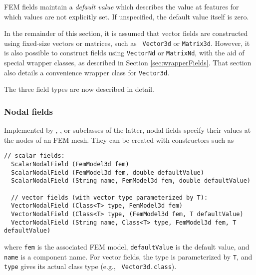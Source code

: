 FEM fields maintain a {\it default value} which describes the value at
features for which values are not explicitly set. If unspecified,
the default value itself is zero.

In the remainder of this section, it is assumed that vector fields are
constructed using fixed-size vectors or matrices, such as {\tt
Vector3d} or {\tt Matrix3d}.  However, it is also possible to
construct fields using {\tt VectorNd} or {\tt MatrixNd}, with the aid
of special wrapper classes, as described in Section
\ref{sec:wrapperFields}. That section also details a convenience
wrapper class for {\tt Vector3d}.

The three field types are now described in detail.

\subsubsection{Nodal fields}

Implemented by
,
, 
or subclasses
of the latter, nodal fields specify their values at the nodes of an
FEM mesh. They can be created with constructors such as
%
\begin{lstlisting}[]
  // scalar fields:
  ScalarNodalField (FemModel3d fem)
  ScalarNodalField (FemModel3d fem, double defaultValue)
  ScalarNodalField (String name, FemModel3d fem, double defaultValue)

  // vector fields (with vector type parameterized by T):
  VectorNodalField (Class<T> type, FemModel3d fem)
  VectorNodalField (Class<T> type, (FemModel3d fem, T defaultValue)
  VectorNodalField (String name, Class<T> type, FemModel3d fem, T defaultValue)
\end{lstlisting}
%
where {\tt fem} is the associated FEM model, {\tt defaultValue} is the
default value, and {\tt name} is a component name. For vector fields,
the  type is parameterized by
{\tt T}, and {\tt type} gives its actual class type (e.g., {\tt
Vector3d.class}).

